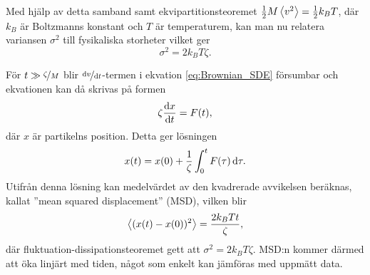 Med hjälp av detta samband samt ekvipartitionsteoremet $\frac{1}{2}M\ev{v^2}=\frac{1}{2}k_BT$, där $k_B$ är Boltzmanns konstant och $T$ är temperaturem, kan man nu relatera variansen $\sigma^2$ till fysikaliska storheter vilket ger 
\begin{equation}
    \sigma^2 = 2k_BT\zeta.
\end{equation}


För $t \gg \nicefrac{\zeta}{M}$ blir $\nicefrac{\dd{v}}{\dd{t}}$-termen i ekvation \eqref{eq:Brownian_SDE}  försumbar och ekvationen kan då skrivas på formen
\begin{equation}
    \zeta \dv{x}{t}=F(t),
\end{equation}
där $x$ är partikelns position. Detta ger lösningen
\begin{equation}
    x(t)=x(0)+\frac{1}{\zeta} \int^t_0 F(\tau)\,\mathrm{d}\tau.
\end{equation}
Utifrån denna lösning kan medelvärdet av den kvadrerade avvikelsen beräknas, kallat ''mean squared displacement'' (MSD), vilken blir 
\begin{equation}
    \ev{(x(t)-x(0))^2}=\frac{2k_BTt}{\zeta},
\end{equation}
där fluktuation-dissipationsteoremet gett att $\sigma^2=2k_BT\zeta$.  MSD:n kommer därmed att öka linjärt med tiden, något som enkelt kan jämföras med uppmätt data.




